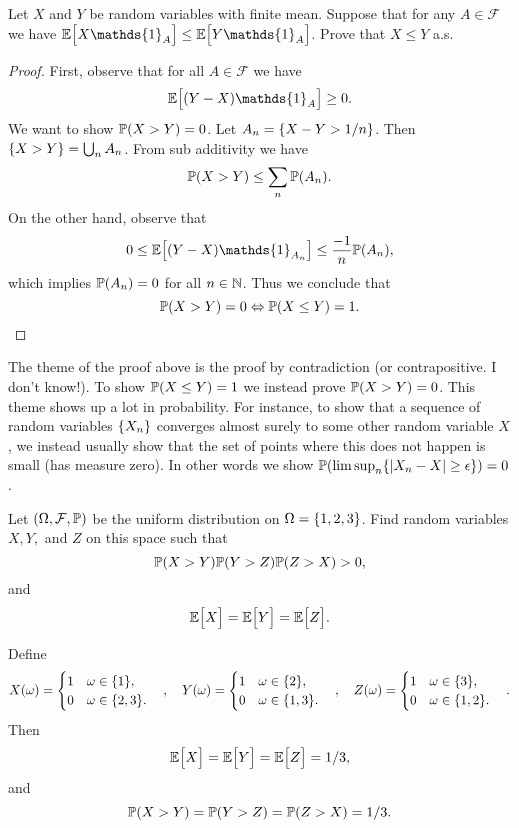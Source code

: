\begin{problem}
	Let $ X $ and $ Y $ be random variables with finite mean. Suppose that for any $ A \in \mathcal{F} $ we have $ \E{X\mathds{1}_A}\leq \E{Y\mathds{1}_A} $. Prove that $ X \leq Y $ a.s.
\end{problem}
\begin{proof}
	First, observe that for all $ A\in\mathcal{F} $ we have 
	\[ \E{(Y-X)\mathds{1}_A} \geq 0.  \]
	We want to show $ \mathbb{P}(X>Y) = 0 $. Let $ A_n = \{X-Y > 1/n\} $. Then $ \{X>Y\} = \bigcup_n A_n $. From sub additivity we have
	\[ \mathbb{P}(X>Y) \leq \sum_n \mathbb{P}(A_n). \]
	On the other hand, observe that 
	\[ 0 \leq \E{(Y-X)\mathds{1}_{A_n}} \leq \frac{-1}{n}\prob(A_n), \]
	which implies $ \mathbb{P}(A_n) = 0 $ for all $ n\in\mathbb{N} $. Thus we conclude that 
	\[ \mathbb{P}(X > Y) = 0 \Leftrightarrow \mathbb{P}(X\leq Y)  =1. \]
\end{proof}
\begin{summary}
	The theme of the proof above is the proof by contradiction (or contrapositive. I don't know!). To show $ \mathbb{P}(X\leq Y) = 1 $ we instead prove $ \mathbb{P}(X>Y) = 0 $. This theme shows up a lot in probability. For instance, to show that a sequence of random variables $ \{X_n\} $ converges almost surely to some other random variable $ X $, we instead usually show that the set of points where this does not happen is small (has measure zero). In other words we show $ \mathbb{P}(\limsup_n \{|X_n-X|\geq \epsilon\}) = 0 $.
\end{summary}

\begin{problem}
	Let $ (\Omega, \mathcal{F},\mathbb{P}) $ be the uniform distribution on $ \Omega = \{1,2,3\} $. Find random variables $ X,Y, $ and $ Z $ on this space such that
	\[ \mathbb{P}(X>Y)\mathbb{P}(Y>Z)\mathbb{P}(Z>X) > 0, \]
	and
	\[ \mathbb{E}\big[X\big] = \mathbb{E}\big[Y\big] = \mathbb{E}\big[Z\big]. \]
\end{problem}
\begin{solution}
	Define 
	\[ X(\omega) = \begin{cases}
		1 \quad \omega \in \{1\},\\
		0 \quad \omega \in \{2,3\}.
	\end{cases},\quad
	Y(\omega) = \begin{cases}
		1 \quad \omega \in \{2\},\\
		0 \quad \omega \in \{1,3\}.
	\end{cases}, \quad
	Z(\omega) = \begin{cases}
		1 \quad \omega \in \{3\},\\
		0 \quad \omega \in \{1,2\}.
	\end{cases}.
	 \]
	 Then 
	 \[ \mathbb{E}\big[X\big] = \mathbb{E}\big[Y\big] = \mathbb{E}\big[Z\big] = 1/3, \]
	 and 
	 \[ \mathbb{P}(X>Y) = \mathbb{P}(Y>Z) = \mathbb{P}(Z>X) = 1/3. \]
\end{solution}

